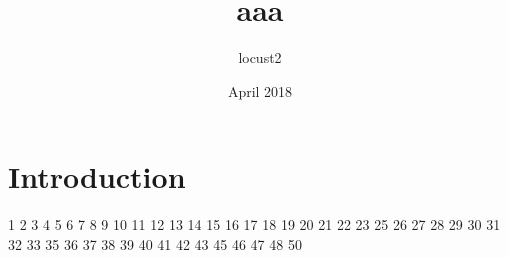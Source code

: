 \documentclass{article}
\title{aaa}
\author{locust2 }
\date{April 2018}
\begin{document}
\maketitle
\section{Introduction}
1
2
3
4
5
6
7
8
9
10
11
12
13
14
15
16
17
18
19
20
21
22
23
25
26
27
28
29
30
31
32
33
35
36
37
38
39
40
41
42
43
45
46
47
48
50
\end{document}
